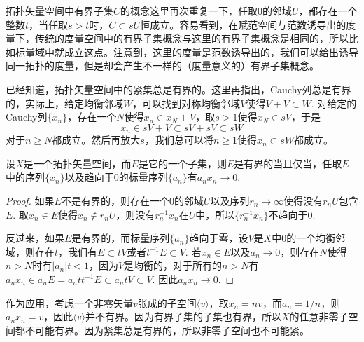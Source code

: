 \begin{para}
	拓扑矢量空间中有界子集$C$的概念这里再次重复一下，任取$0$的邻域$U$，都存在一个整数$t$，当任取$s>t$时，$C\subset sU$恒成立。容易看到，在赋范空间与范数诱导出的度量下，传统的度量空间中的有界子集概念与这里的有界子集概念是相同的，所以比如标量域中就成立这点。注意到，这里的度量是范数诱导出的，我们可以给出诱导同一拓扑的度量，但是却会产生不一样的（度量意义的）有界子集概念。

	已经知道，拓扑矢量空间中的紧集总是有界的。这里再指出，Cauchy列总是有界的，实际上，给定均衡邻域$W$，可以找到对称均衡邻域$V$使得$V+V\subset W$. 对给定的Cauchy列$\{x_n\}$，存在一个$N$使得$x_n\in x_N+V$，取$s>1$使得$x_N\in sV$，于是
	\[
	x_n\in sV+V\subset sV+sV\subset sW
	\]
	对于$n\geq N$都成立。然后再放大$s$，我们总可以将$n\geq 1$使得$x_n\subset sW$都成立。
\end{para}

\begin{pro}\label{p.1.39}
设$X$是一个拓扑矢量空间，而$E$是它的一个子集，则$E$是有界的当且仅当，任取$E$中的序列$\{x_n\}$以及趋向于$0$的标量序列$\{a_n\}$有$a_nx_n\to 0$.
\end{pro}

\begin{proof}
	如果$E$不是有界的，则存在一个$0$的邻域$U$以及序列$r_n\to \infty$使得没有$r_n U$包含$E$. 取$x_n \in E$使得$x_n \not\in r_n U$，则没有$r_n^{-1}x_n$在$U$中，所以$\{r_n^{-1}x_n\}$不趋向于$0$.

	反过来，如果$E$是有界的，而标量序列$\{a_n\}$趋向于零，设$V$是$X$中$0$的一个均衡邻域，则存在$t$，我们有$E\subset tV$或者$t^{-1}E\subset V$. 若$x_n\in E$以及$a_n\to 0$，则存在$N$使得$n>N$时有$|a_n|t<1$，因为$V$是均衡的，对于所有的$n>N$有$a_nx_n\in a_n E=a_nt t^{-1}E\subset a_n t V \subset V$. 因此$a_nx_n\to 0$.
\end{proof}

作为应用，考虑一个非零矢量$v$张成的子空间$\langle v\rangle$，取$x_n=nv$，而$a_n=1/n$，则$a_nx_n=v$，因此$\langle v\rangle$并不有界。因为有界子集的子集也有界，所以$X$的任意非零子空间都不可能有界。因为紧集总是有界的，所以非零子空间也不可能紧。


